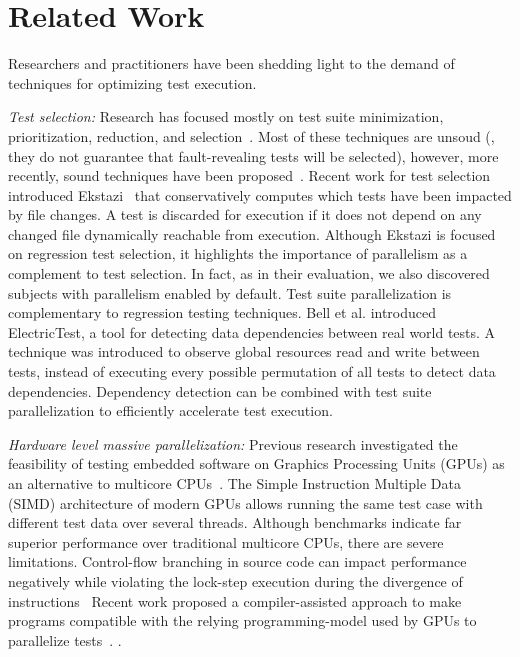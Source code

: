 \section{Related Work}
\label{sec:related}
Researchers and practitioners have been shedding light to the demand
of techniques for optimizing test execution.


\textit{Test selection:} Research has focused mostly on test suite
minimization, prioritization, reduction, and
selection~\cite{yoo-harman-stvr2012}.   Most of these
techniques are unsoud (\ie{}, they do not guarantee that
fault-revealing tests will be selected), however, more recently, sound
techniques have been
proposed~\cite{gligoric-etal-issta2015,soetens-etal-2016}. Recent work
for test selection introduced
Ekstazi~\cite{ekstazi-web,gligoric-etal-issta2015} that conservatively
computes which tests have been impacted by file changes.  A test is
discarded for execution if it does not depend on any changed file
dynamically reachable from execution. Although Ekstazi is focused on
regression test selection, it highlights the importance of parallelism
as a complement to test selection.  In fact, as in their evaluation,
we also discovered subjects with parallelism enabled by default.
Test suite parallelization is complementary to regression testing
techniques.
Bell et al. introduced ElectricTest, a tool for detecting
data dependencies between real world tests. A technique was introduced
to observe global resources read and write between tests, instead of
executing every possible permutation of all tests to detect data
dependencies. Dependency detection can be combined with test suite
parallelization to efficiently accelerate test execution.

\textit{Hardware level massive parallelization:} Previous research
investigated the feasibility of testing embedded software on Graphics
Processing Units (GPUs) as an alternative to multicore
CPUs~\cite{rajan-etal-ase2014}.  The Simple Instruction Multiple Data
(SIMD) architecture of modern GPUs allows running the same test case
with different test data over several threads.  Although benchmarks
indicate far superior performance over traditional multicore CPUs,
there are severe limitations. Control-flow branching in source code
can impact performance negatively while violating the lock-step
execution during the divergence of instructions~\cite{rajan-etal-ase2014}
Recent work proposed a compiler-assisted approach to make programs
compatible with the relying programming-model used by
GPUs to parallelize tests~\cite{yaneva-etal-issta2017}.
.

